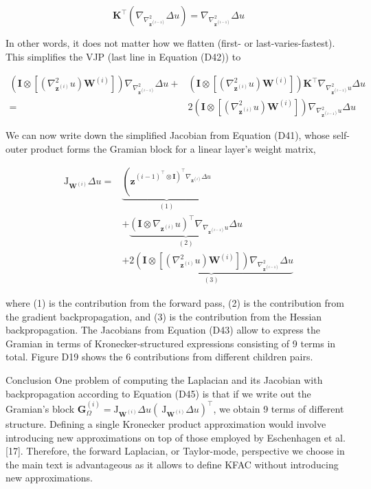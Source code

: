 \documentclass[10pt]{article}
\begin{document}
$$
\boldsymbol{K}^{\top}\left(\nabla_{\nabla_{\boldsymbol{z}^{(i-1)}}^{2}} \Delta u\right)=\nabla_{\nabla_{\boldsymbol{z}^{(i-1)}}^{2}} \Delta u
$$

In other words, it does not matter how we flatten (first- or last-varies-fastest). This simplifies the VJP (last line in Equation (D42)) to

$$
\begin{aligned}
\left(\boldsymbol{I} \otimes\left[\left(\nabla_{\boldsymbol{z}^{(i)}}^{2} u\right) \boldsymbol{W}^{(i)}\right]\right) \nabla_{\nabla_{\boldsymbol{z}^{(i-1)}}^{2}} \Delta u+ & \left(\boldsymbol{I} \otimes\left[\left(\nabla_{\boldsymbol{z}^{(i)}}^{2} u\right) \boldsymbol{W}^{(i)}\right]\right) \boldsymbol{K}^{\top} \nabla_{\nabla_{\boldsymbol{z}^{(i-1)}}^{2} u} \Delta u \\
= & 2\left(\boldsymbol{I} \otimes\left[\left(\nabla_{\boldsymbol{z}^{(i)}}^{2} u\right) \boldsymbol{W}^{(i)}\right]\right) \nabla_{\nabla_{\boldsymbol{z}^{(i-1)}}^{2} u} \Delta u
\end{aligned}
$$

We can now write down the simplified Jacobian from Equation (D41), whose self-outer product forms the Gramian block for a linear layer's weight matrix,


\begin{align*}
\mathrm{J}_{\boldsymbol{W}^{(i)}} \Delta u= & \underbrace{\left(\boldsymbol{z}^{\left.(i-1)^{\top} \otimes \boldsymbol{I}\right)^{\top} \nabla_{\boldsymbol{z}^{(i)}} \Delta u}\right.}_{(1)} \\
& +\underbrace{\left(\boldsymbol{I} \otimes \nabla_{\boldsymbol{z}^{(i)}} u\right)^{\top} \nabla_{\nabla_{\boldsymbol{z}^{(i-1)}} u} \Delta u}_{(2)}  \tag{D45}\\
& +\underbrace{2\left(\boldsymbol{I} \otimes\left[\left(\nabla_{\boldsymbol{z}^{(i)}}^{2} u\right) \boldsymbol{W}^{(i)}\right]\right) \nabla_{\nabla_{\boldsymbol{z}^{(i-1)}}^{2}} \Delta u}_{(3)}
\end{align*}


where (1) is the contribution from the forward pass, (2) is the contribution from the gradient backpropagation, and (3) is the contribution from the Hessian backpropagation. The Jacobians from Equation (D43) allow to express the Gramian in terms of Kronecker-structured expressions consisting of 9 terms in total. Figure D19 shows the 6 contributions from different children pairs.

Conclusion One problem of computing the Laplacian and its Jacobian with backpropagation according to Equation (D45) is that if we write out the Gramian's block $\boldsymbol{G}_{\Omega}^{(i)}=\mathrm{J}_{\boldsymbol{W}^{(i)}} \Delta u\left(\mathrm{~J}_{\boldsymbol{W}^{(i)}} \Delta u\right)^{\top}$, we obtain 9 terms of different structure. Defining a single Kronecker product approximation would involve introducing new approximations on top of those employed by Eschenhagen et al. [17]. Therefore, the forward Laplacian, or Taylor-mode, perspective we choose in the main text is advantageous as it allows to define KFAC without introducing new approximations.
\end{document}
